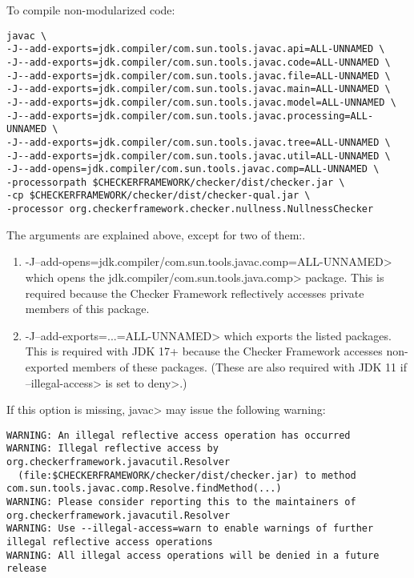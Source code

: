 
To compile non-modularized code:

\begin{Verbatim}
javac \
-J--add-exports=jdk.compiler/com.sun.tools.javac.api=ALL-UNNAMED \
-J--add-exports=jdk.compiler/com.sun.tools.javac.code=ALL-UNNAMED \
-J--add-exports=jdk.compiler/com.sun.tools.javac.file=ALL-UNNAMED \
-J--add-exports=jdk.compiler/com.sun.tools.javac.main=ALL-UNNAMED \
-J--add-exports=jdk.compiler/com.sun.tools.javac.model=ALL-UNNAMED \
-J--add-exports=jdk.compiler/com.sun.tools.javac.processing=ALL-UNNAMED \
-J--add-exports=jdk.compiler/com.sun.tools.javac.tree=ALL-UNNAMED \
-J--add-exports=jdk.compiler/com.sun.tools.javac.util=ALL-UNNAMED \
-J--add-opens=jdk.compiler/com.sun.tools.javac.comp=ALL-UNNAMED \
-processorpath $CHECKERFRAMEWORK/checker/dist/checker.jar \
-cp $CHECKERFRAMEWORK/checker/dist/checker-qual.jar \
-processor org.checkerframework.checker.nullness.NullnessChecker
\end{Verbatim}

The arguments are explained above, except for two of them:.
\begin{enumerate}

\item \<-J--add-opens=jdk.compiler/com.sun.tools.javac.comp=ALL-UNNAMED> which
opens the \<jdk.compiler/com.sun.tools.java.comp> package.  This is
required because the Checker Framework reflectively accesses private members of this package.

\item \<-J--add-exports=...=ALL-UNNAMED> which exports the listed packages.  This is
required with JDK 17+ because the Checker Framework accesses non-exported members of these packages.
(These are also required with JDK 11 if \<--illegal-access> is set to \<deny>.)

\end{enumerate}

If this option is missing, \<javac> may issue the following warning:
\begin{Verbatim}
WARNING: An illegal reflective access operation has occurred
WARNING: Illegal reflective access by org.checkerframework.javacutil.Resolver
  (file:$CHECKERFRAMEWORK/checker/dist/checker.jar) to method com.sun.tools.javac.comp.Resolve.findMethod(...)
WARNING: Please consider reporting this to the maintainers of org.checkerframework.javacutil.Resolver
WARNING: Use --illegal-access=warn to enable warnings of further illegal reflective access operations
WARNING: All illegal access operations will be denied in a future release
\end{Verbatim}


